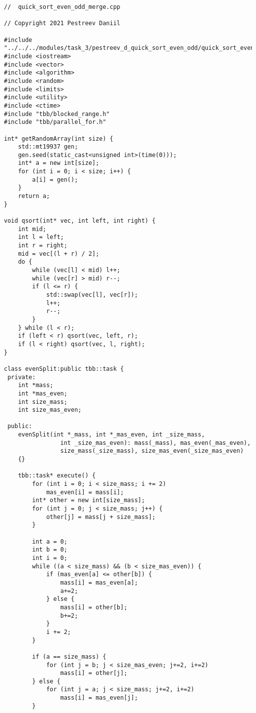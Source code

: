 \documentclass{report}
\begin{document}
\begin{lstlisting}
//  quick_sort_even_odd_merge.cpp

// Copyright 2021 Pestreev Daniil

#include "../../../modules/task_3/pestreev_d_quick_sort_even_odd/quick_sort_even_odd_merge.h"
#include <iostream>
#include <vector>
#include <algorithm>
#include <random>
#include <limits>
#include <utility>
#include <ctime>
#include "tbb/blocked_range.h"
#include "tbb/parallel_for.h"

int* getRandomArray(int size) {
    std::mt19937 gen;
    gen.seed(static_cast<unsigned int>(time(0)));
    int* a = new int[size];
    for (int i = 0; i < size; i++) {
        a[i] = gen();
    }
    return a;
}

void qsort(int* vec, int left, int right) {
    int mid;
    int l = left;
    int r = right;
    mid = vec[(l + r) / 2];
    do {
        while (vec[l] < mid) l++;
        while (vec[r] > mid) r--;
        if (l <= r) {
            std::swap(vec[l], vec[r]);
            l++;
            r--;
        }
    } while (l < r);
    if (left < r) qsort(vec, left, r);
    if (l < right) qsort(vec, l, right);
}

class evenSplit:public tbb::task {
 private:
    int *mass;
    int *mas_even;
    int size_mass;
    int size_mas_even;

 public:
    evenSplit(int *_mass, int *_mas_even, int _size_mass,
                int _size_mas_even): mass(_mass), mas_even(_mas_even),
                size_mass(_size_mass), size_mas_even(_size_mas_even)
    {}

    tbb::task* execute() {
        for (int i = 0; i < size_mass; i += 2)
            mas_even[i] = mass[i];
        int* other = new int[size_mass];
        for (int j = 0; j < size_mass; j++) {
            other[j] = mass[j + size_mass];
        }

        int a = 0;
        int b = 0;
        int i = 0;
        while ((a < size_mass) && (b < size_mas_even)) {
            if (mas_even[a] <= other[b]) {
                mass[i] = mas_even[a];
                a+=2;
            } else {
                mass[i] = other[b];
                b+=2;
            }
            i += 2;
        }

        if (a == size_mass) {
            for (int j = b; j < size_mas_even; j+=2, i+=2)
                mass[i] = other[j];
        } else {
            for (int j = a; j < size_mass; j+=2, i+=2)
                mass[i] = mas_even[j];
        }


\end{lstlisting}
\end{document}
